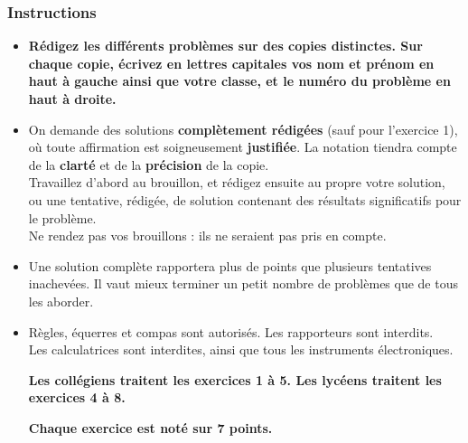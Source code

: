 \subsubsection*{Instructions}\renewcommand{\labelitemi}{$\triangleright$}
\begin{itemize}

 \item \textbf{R\'edigez les diff\'erents probl\`emes sur des copies distinctes. Sur chaque copie, \'ecrivez en lettres capitales
vos nom et pr\'enom en haut \`a gauche ainsi que votre classe, et le num\'ero du probl\`eme en haut \`a droite.}
\medskip
\item On demande des solutions \textbf{compl\`etement r\'edig\'ees} (sauf pour l'exercice 1), o\`u toute affirmation est soigneusement \textbf{justifi\'ee}. La
notation tiendra compte de la \textbf{clart\'e} et de la \textbf{pr\'ecision} de la copie.\\
\quad Travaillez d'abord au brouillon, et r\'edigez ensuite au propre votre solution, ou une tentative, r\'edig\'ee, de
solution contenant des r\'esultats significatifs pour le probl\`eme.\\
\quad Ne rendez pas vos brouillons : ils ne seraient pas pris en compte.
\medskip
\item Une solution compl\`ete rapportera plus de points que plusieurs tentatives inachev\'ees. Il vaut mieux
terminer un petit nombre de probl\`emes que de tous les aborder.

\medskip\item R\`egles, \'equerres et compas sont autoris\'es. Les rapporteurs sont interdits.\\
Les calculatrices sont interdites, ainsi que tous les instruments \'electroniques.





\bigskip
\textbf{Les coll\'egiens traitent les exercices 1 \`a 5. Les lyc\'eens traitent les exercices 4 \`a 8.}

\textbf{Chaque exercice est not\'e sur 7 points.}

%
%
%



\end{itemize}
